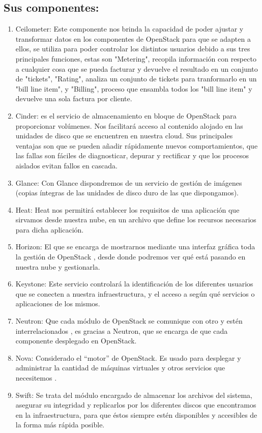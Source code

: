 \documentclass[12pt,letterpaper]{article}
\begin{document}
\subsection{Sus componentes:}
    \begin{enumerate}
    \item  Ceilometer: Este componente nos brinda la capacidad de poder ajustar y transformar datos en los 
componentes de OpenStack para que se adapten a ellos, se utiliza para poder controlar
los distintos usuarios debido a sus tres principales funciones, estas son "Metering",
recopila información con respecto a cualquier cosa que se pueda facturar y devuelve
el resultado en un conjunto de "tickets", "Rating", analiza un conjunto de tickets
para tranformarlo en un "bill line item", y "Billing", proceso que ensambla todos los
"bill line item" y devuelve una sola factura por cliente.

\item  Cinder:
es el servicio de almacenamiento en bloque de OpenStack para proporcionar volúmenes. 
Nos facilitará acceso al contenido alojado en las unidades de disco que se encuentren 
en nuestra cloud. Sus principales ventajas son que se pueden añadir rápidamente nuevos 
comportamientos, que las fallas son fáciles de diagnosticar, depurar y rectificar y que
los procesos aislados evitan fallos en cascada.
\item  Glance:
Con Glance dispondremos de un servicio de gestión de imágenes (copias íntegras de las
 unidades de disco duro de las que dispongamos).
\item  Heat:
Heat nos permitirá establecer los requisitos de una aplicación que sirvamos desde 
nuestra nube, en un archivo que define los recursos necesarios para dicha aplicación. 
\item  Horizon:
El que se encarga de mostrarnos mediante una interfaz gráfica toda la gestión de 
OpenStack , desde donde podremos ver qué está pasando en nuestra nube y gestionarla.
\item  Keystone:
Este servicio controlará la identificación de los diferentes usuarios que se conecten
 a nuestra infraestructura, y el acceso a según qué servicios o aplicaciones de los 
mismos.
\item  Neutron:
Que cada módulo de OpenStack se comunique con otro y estén interrelacionados , es 
gracias a Neutron, que se encarga de que cada componente desplegado en OpenStack.
\item  Nova:
Considerado el “motor” de OpenStack. Es usado para desplegar y administrar la cantidad
 de máquinas virtuales y otros servicios que necesitemos .
\item  Swift:
Se trata del módulo encargado de almacenar los archivos del sistema, asegurar su 
integridad y replicarlos por los diferentes discos que encontramos en la 
infraestructura, para que éstos siempre estén disponibles y accesibles de la forma más
 rápida posible.
	\end{enumerate}	
		
\end{document}
